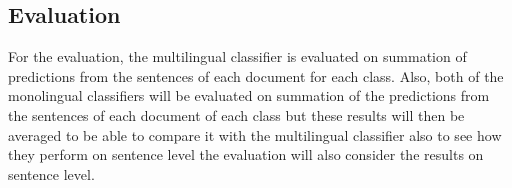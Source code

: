 \subsection*{Evaluation}

For the evaluation, the multilingual classifier is evaluated on summation of predictions from the sentences of each document for each class. Also, both of the monolingual classifiers will be evaluated on summation of the predictions from the sentences of each document of each class but these results will then be averaged to be able to compare it with the multilingual classifier also to see how they perform on sentence level the evaluation will also consider the results on sentence level.

